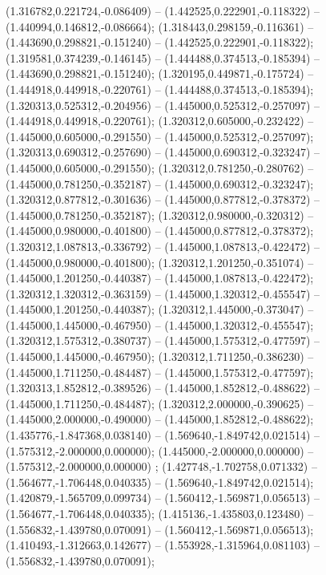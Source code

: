  (1.316782,0.221724,-0.086409) -- (1.442525,0.222901,-0.118322) -- (1.440994,0.146812,-0.086664);
 (1.318443,0.298159,-0.116361) -- (1.443690,0.298821,-0.151240) -- (1.442525,0.222901,-0.118322);
 (1.319581,0.374239,-0.146145) -- (1.444488,0.374513,-0.185394) -- (1.443690,0.298821,-0.151240);
 (1.320195,0.449871,-0.175724) -- (1.444918,0.449918,-0.220761) -- (1.444488,0.374513,-0.185394);
 (1.320313,0.525312,-0.204956) -- (1.445000,0.525312,-0.257097) -- (1.444918,0.449918,-0.220761);
 (1.320312,0.605000,-0.232422) -- (1.445000,0.605000,-0.291550) -- (1.445000,0.525312,-0.257097);
 (1.320313,0.690312,-0.257690) -- (1.445000,0.690312,-0.323247) -- (1.445000,0.605000,-0.291550);
 (1.320312,0.781250,-0.280762) -- (1.445000,0.781250,-0.352187) -- (1.445000,0.690312,-0.323247);
 (1.320312,0.877812,-0.301636) -- (1.445000,0.877812,-0.378372) -- (1.445000,0.781250,-0.352187);
 (1.320312,0.980000,-0.320312) -- (1.445000,0.980000,-0.401800) -- (1.445000,0.877812,-0.378372);
 (1.320312,1.087813,-0.336792) -- (1.445000,1.087813,-0.422472) -- (1.445000,0.980000,-0.401800);
 (1.320312,1.201250,-0.351074) -- (1.445000,1.201250,-0.440387) -- (1.445000,1.087813,-0.422472);
 (1.320312,1.320312,-0.363159) -- (1.445000,1.320312,-0.455547) -- (1.445000,1.201250,-0.440387);
 (1.320312,1.445000,-0.373047) -- (1.445000,1.445000,-0.467950) -- (1.445000,1.320312,-0.455547);
 (1.320312,1.575312,-0.380737) -- (1.445000,1.575312,-0.477597) -- (1.445000,1.445000,-0.467950);
 (1.320312,1.711250,-0.386230) -- (1.445000,1.711250,-0.484487) -- (1.445000,1.575312,-0.477597);
 (1.320313,1.852812,-0.389526) -- (1.445000,1.852812,-0.488622) -- (1.445000,1.711250,-0.484487);
 (1.320312,2.000000,-0.390625) -- (1.445000,2.000000,-0.490000) -- (1.445000,1.852812,-0.488622);
 (1.435776,-1.847368,0.038140) -- (1.569640,-1.849742,0.021514) -- (1.575312,-2.000000,0.000000);
 (1.445000,-2.000000,0.000000) -- (1.575312,-2.000000,0.000000) ;
 (1.427748,-1.702758,0.071332) -- (1.564677,-1.706448,0.040335) -- (1.569640,-1.849742,0.021514);
 (1.420879,-1.565709,0.099734) -- (1.560412,-1.569871,0.056513) -- (1.564677,-1.706448,0.040335);
 (1.415136,-1.435803,0.123480) -- (1.556832,-1.439780,0.070091) -- (1.560412,-1.569871,0.056513);
 (1.410493,-1.312663,0.142677) -- (1.553928,-1.315964,0.081103) -- (1.556832,-1.439780,0.070091);
